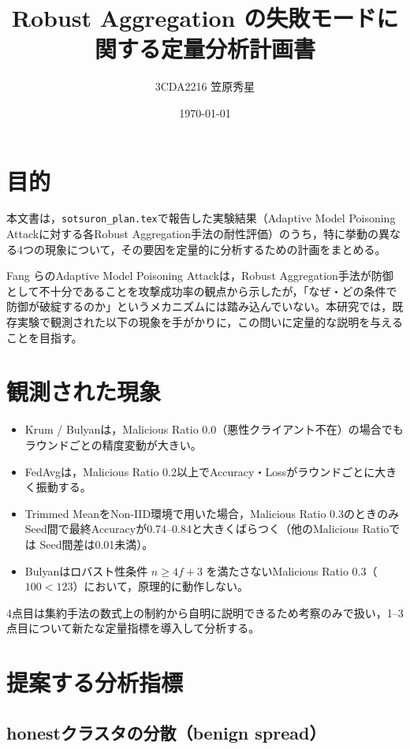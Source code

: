 \documentclass[a4j, twocolumn, dvipdfmx]{jsarticle}
\title{
Robust Aggregation の失敗モードに関する定量分析計画書
}
\author{3CDA2216 笠原秀星}
\date{\today}
\begin{document}
\maketitle

\section{目的}

本文書は，\texttt{sotsuron\_plan.tex}で報告した実験結果（Adaptive Model Poisoning Attackに対する各Robust Aggregation手法の耐性評価）のうち，特に挙動の異なる4つの現象について，その要因を定量的に分析するための計画をまとめる。

Fang ら\cite{fang2020local}のAdaptive Model Poisoning Attackは，Robust Aggregation手法が防御として不十分であることを攻撃成功率の観点から示したが，「なぜ・どの条件で防御が破綻するのか」というメカニズムには踏み込んでいない。本研究では，既存実験で観測された以下の現象を手がかりに，この問いに定量的な説明を与えることを目指す。

\section{観測された現象}

\begin{itemize}
  \item Krum / Bulyanは，Malicious Ratio 0.0（悪性クライアント不在）の場合でもラウンドごとの精度変動が大きい。
  \item FedAvgは，Malicious Ratio 0.2以上でAccuracy・Lossがラウンドごとに大きく振動する。
  \item Trimmed MeanをNon-IID環境で用いた場合，Malicious Ratio 0.3のときのみSeed間で最終Accuracyが0.74--0.84と大きくばらつく（他のMalicious Ratioでは Seed間差は0.01未満）。
  \item Bulyanはロバスト性条件 $n \geq 4f+3$ を満たさないMalicious Ratio 0.3（$100 < 123$）において，原理的に動作しない。
\end{itemize}

4点目は集約手法の数式上の制約から自明に説明できるため考察のみで扱い，1--3点目について新たな定量指標を導入して分析する。

\section{提案する分析指標}

\subsection{honestクラスタの分散（benign spread）}
\end{document}
